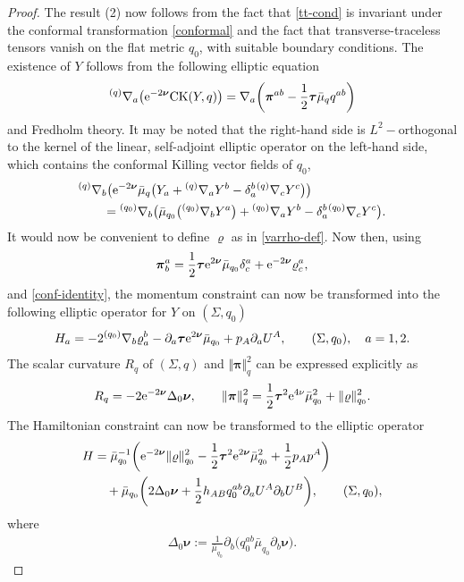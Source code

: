 \documentclass[pdftex]{sigma}
\def\ptl{\partial}%
\def\mbo#1{\boldsymbol{#1}}%
\def\grad{{\nabla}}%
\newcommand{\leftexp}[2]{{\vphantom{#2}}^{#1}{#2}}
\def\halb{\frac{1}{2}}%
\numberwithin{equation}{section}
\begin{document}
\begin{proof}
The result (2) now follows from the fact that \eqref{tt-cond} is invariant under the conformal transformation \eqref{conformal} and the fact that transverse-traceless tensors vanish on the flat metric $q_0$, with suitable boundary conditions. The existence of $Y$ follows from the following elliptic equation
\begin{align*}
\leftexp{(q)}{\grad}_a \bigl({\rm e}^{-2 \mbo{\nu}} {\rm CK} (Y, q)\bigr) = \grad_a \biggl(\mbo{\pi}^{ab} -\halb \mbo{\tau} \bar{\mu}_q q^{ab}\biggr)
\end{align*}
 and Fredholm theory. It may be noted that the right-hand side is $L^2-$orthogonal to the kernel of the linear, self-adjoint elliptic operator on the left-hand side, which contains the conformal Killing vector fields of $q_0$,
\begin{align} %
&\leftexp{(q)}{\grad}_b \bigl({\rm e}^{-2\mbo{\nu}} \bar{\mu}_q \bigl(Y_a + \leftexp{(q)}{\grad}_a Y^b - \delta^b_a \leftexp{(q)}{\grad}_c Y^c\bigr) \bigr) \notag\\
&\qquad{}= \leftexp{(q_0)}{\grad}_b \bigl(\bar{\mu}_{q_0}\bigl(\leftexp{(q_0)}{\grad}_b Y^a\bigr) + \leftexp{(q_0)}{\grad}_a Y^b - \delta^b_a \leftexp{(q_0)}{\grad}_c Y^c\bigr) . \label{conf-identity}
\end{align}
It would now be convenient to define $\varrho$ as in \eqref{varrho-def}. Now then, using
\begin{align*}
\mbo{\pi}^a_b = \halb \mbo{\tau} {\rm e}^{2 \mbo{\nu}} \bar{\mu}_{q_0} \delta^a_c + {\rm e}^{-2 \mbo{\nu}} \varrho^a_c,
\end{align*}
and \eqref{conf-identity}, the momentum constraint can now be transformed into the following elliptic operator for $Y$ on $(\Sigma, q_0)$
\begin{align*}
H_a = -2\leftexp{(q_0)}{\grad}_b \varrho^b_a - \ptl_a \mbo{\tau} {\rm e}^{2 \mbo{\nu}} \bar{\mu}_{q_0} + p_A \ptl_a U^A, \qquad (\Sigma, q_0), \quad a= 1, 2.
\end{align*}
The scalar curvature $R_q$ of $(\Sigma, q)$ and $\Vert \mbo{\pi} \Vert^2_q$ can be expressed explicitly as
\begin{align*}
R_q = -2 {\rm e}^{-2 \mbo{\nu}} \Delta_0 \mbo{\nu}, \qquad \Vert \mbo{\pi} \Vert^2_q = \halb \mbo{\tau}^2 {\rm e}^{4 \nu} \bar{\mu}^2_{q_0} + \Vert \varrho \Vert^2_{q_0}.
\end{align*}
The Hamiltonian constraint can now be transformed to the elliptic operator
\begin{align*}
H &{}= \bar{\mu}^{-1}_{q_0} \biggl({\rm e}^{-2 \mbo{\nu}} \Vert \varrho \Vert^2_{q_0} - \halb \mbo{\tau}^2 {\rm e}^{2 \mbo{\nu}} \bar{\mu}^2_{q_0} + \halb p_A p^A\biggr) \notag\\
&\quad{}+ \bar{\mu}_{q_0} \biggl(2 \Delta_0 \mbo{\nu} + \halb h_{AB} q_0^{ab} \ptl_a U^A \ptl_b U^B\biggr), \qquad (\Sigma, q_0),
\end{align*}
where
\begin{align*}
\Delta_0 \mbo{\nu} := \frac{1}{\bar{\mu}_{q_0}} \ptl_b\bigl(q^{ab}_0 \bar{\mu}_{q_0} \ptl_b \mbo{\nu}\bigr).
\tag*{\qed}
\end{align*}
\renewcommand{\qed}{}
\end{proof}
\end{document}
